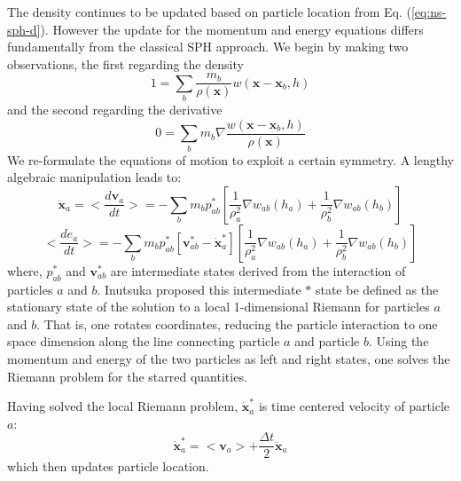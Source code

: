 \documentclass[review]{elsarticle}
\begin{document}
The density continues to be updated based on particle location from Eq. (\ref{eq:ns-sph-d}).
However the update for the momentum and energy equations differs fundamentally from the
classical SPH approach. We begin by making two observations, the first regarding the density
\begin{equation}
1=\sum_{b} \frac{m_{b}}{\rho(\textbf{x})}w(\textbf{x} - \textbf{x}_{b}, h)
\label{eq:GSPH-basic1}
\end{equation}
and the second regarding the derivative 
\begin{equation}
0=\sum_{b} m_{b} \nabla \frac{w(\textbf{x} - \textbf{x}_{b}, h)}{\rho(\textbf{x})}
\label{eq:GSPH-basic2}
\end{equation}
We re-formulate the equations of motion to exploit a certain symmetry. A
lengthy algebraic manipulation \citep{inutsuka2002reformulation,iwasaki2011smoothed} leads to:
\begin{equation}
\ddot{\textbf{x}}_{a} = <\dfrac{d \textbf{v}_{a}}{dt}>= -\sum_{b} m_{b} p_{a b}^{\ast} \left[\frac{1}{\rho_{a}^2} \nabla w_{a b}(h_{a}) + \frac{1}{\rho_{b}^2} \nabla w_{a b}(h_{b}) \right]
\label{eq:gov-gsph-v-simple-form}
\end{equation}
\begin{equation}
<\dfrac{d e_{a}}{dt}>= - \sum_{b} m_{b} p_{a b}^{\ast} [\textbf{v}_{a b}^{\ast} - \dot{\textbf{x}}_{a}^{\ast}] \left[\frac{1}{\rho_{a}^2} \nabla w_{a b}(h_{a}) + \frac{1}{\rho_{b}^2} \nabla w_{a b}(h_{b}) \right]
\label{eq:gov-gsph-e-simple-form}
\end{equation}
where, $p_{a b}^{\ast}$ and $\textbf{v}_{a b}^{\ast}$ are intermediate states derived from
the interaction of particles $a$ and $b$. Inutsuka proposed this intermediate $\ast$ state 
be defined as the stationary state of the solution to a local 1-dimensional Riemann for particles
$a$ and $b$.  That is, one rotates coordinates, reducing the particle interaction to  
one space dimension along the line connecting particle $a$ and particle $b$. Using the
momentum and energy of the two particles as 
left and right states, one solves the Riemann problem for the starred quantities.

Having solved the local Riemann problem, 
$\dot{\textbf{x}}_{a}^{\ast}$ is time centered velocity of particle $a$:
\begin{equation}
\dot{\textbf{x}}_{a}^{\ast} = <\textbf{v}_{a}> + \frac{\Delta t}{2} \ddot{\textbf{x}}_{a}
\end{equation}
which then updates particle location.
\end{document}
